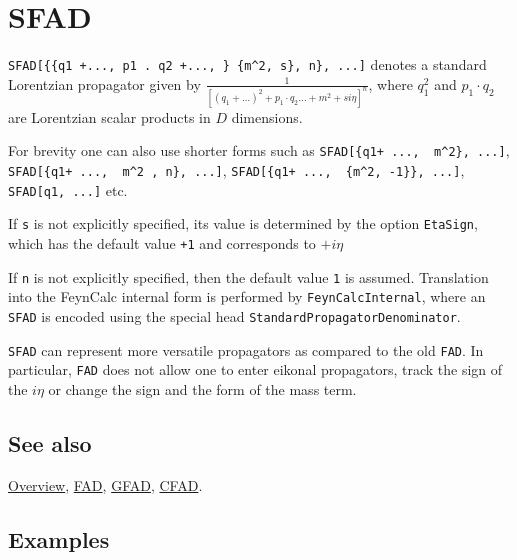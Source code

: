 \documentclass[../FeynCalcManual.tex]{subfiles}
\begin{document}
\hypertarget{sfad}{
\section{SFAD}\label{sfad}}

\texttt{SFAD[\allowbreak{}\{\allowbreak{}\{\allowbreak{}q1 +...,\ \allowbreak{}p1 . q2 +...,\ \allowbreak{}\} \{\allowbreak{}m^2,\ \allowbreak{}s\},\ \allowbreak{}n\},\ \allowbreak{}...]}
denotes a standard Lorentzian propagator given by
\(\frac{1}{[(q_1+\ldots)^2 + p_1 \cdot q_2 ... + m^2 + s i \eta]^n}\),
where \(q_1^2\) and \(p_1 \cdot q_2\) are Lorentzian scalar products in
\(D\) dimensions.

For brevity one can also use shorter forms such as
\texttt{SFAD[\allowbreak{}\{\allowbreak{}q1+ ...,\ \allowbreak{} m^2\},\ \allowbreak{}...]},
\texttt{SFAD[\allowbreak{}\{\allowbreak{}q1+ ...,\ \allowbreak{} m^2 ,\ \allowbreak{}n\},\ \allowbreak{}...]},
\texttt{SFAD[\allowbreak{}\{\allowbreak{}q1+ ...,\ \allowbreak{} \{\allowbreak{}m^2,\ \allowbreak{}-1\}\},\ \allowbreak{}...]},
\texttt{SFAD[\allowbreak{}q1,\ \allowbreak{}...]} etc.

If \texttt{s} is not explicitly specified, its value is determined by
the option \texttt{EtaSign}, which has the default value \texttt{+1} and
corresponds to \(+ i \eta\)

If \texttt{n} is not explicitly specified, then the default value
\texttt{1} is assumed. Translation into the FeynCalc internal form is
performed by \texttt{FeynCalcInternal}, where an \texttt{SFAD} is
encoded using the special head \texttt{StandardPropagatorDenominator}.

\texttt{SFAD} can represent more versatile propagators as compared to
the old \texttt{FAD}. In particular, \texttt{FAD} does not allow one to
enter eikonal propagators, track the sign of the \(i \eta\) or change
the sign and the form of the mass term.

\subsection{See also}

\hyperlink{toc}{Overview}, \hyperlink{fad}{FAD}, \hyperlink{gfad}{GFAD},
\hyperlink{cfad}{CFAD}.

\subsection{Examples}

\begin{Shaded}
\begin{Highlighting}[]
\OperatorTok{[\{\{}\OperatorTok{,} \OperatorTok{\},} \SpecialCharTok{\^{}}\OperatorTok{\}]}
\end{Highlighting}
\end{Shaded}
\end{document}
